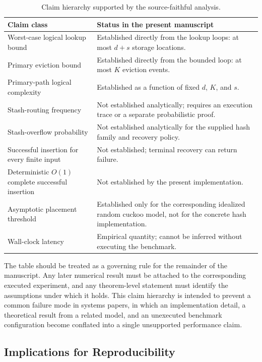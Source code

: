 \documentclass[conference]{IEEEtran}
\begin{document}
\begin{table}[!t]
\caption{Claim hierarchy supported by the source-faithful analysis.}
\label{table:claim-hierarchy}
\centering
\begin{tabular}{p{}p{}}
\toprule
\textbf{Claim class} & \textbf{Status in the present manuscript}\\
\midrule
Worst-case logical lookup bound & Established directly from the lookup loops: at most $d+s$ storage locations.\\
Primary eviction bound & Established directly from the bounded loop: at most $K$ eviction events.\\
Primary-path logical complexity & Established as a function of fixed $d$, $K$, and $s$.\\
Stash-routing frequency & Not established analytically; requires an execution trace or a separate probabilistic proof.\\
Stash-overflow probability & Not established analytically for the supplied hash family and recovery policy.\\
Successful insertion for every finite input & Not established; terminal recovery can return failure.\\
Deterministic $O(1)$ complete successful insertion & Not established by the present implementation.\\
Asymptotic placement threshold & Established only for the corresponding idealized random cuckoo model, not for the concrete hash implementation.\\
Wall-clock latency & Empirical quantity; cannot be inferred without executing the benchmark.\\
\bottomrule
\end{tabular}
\end{table}

The table should be treated as a governing rule for the remainder of the manuscript. Any later numerical result must be attached to the corresponding executed experiment, and any theorem-level statement must identify the assumptions under which it holds. This claim hierarchy is intended to prevent a common failure mode in systems papers, in which an implementation detail, a theoretical result from a related model, and an unexecuted benchmark configuration become conflated into a single unsupported performance claim.

\subsection{Implications for Reproducibility}
\end{document}

